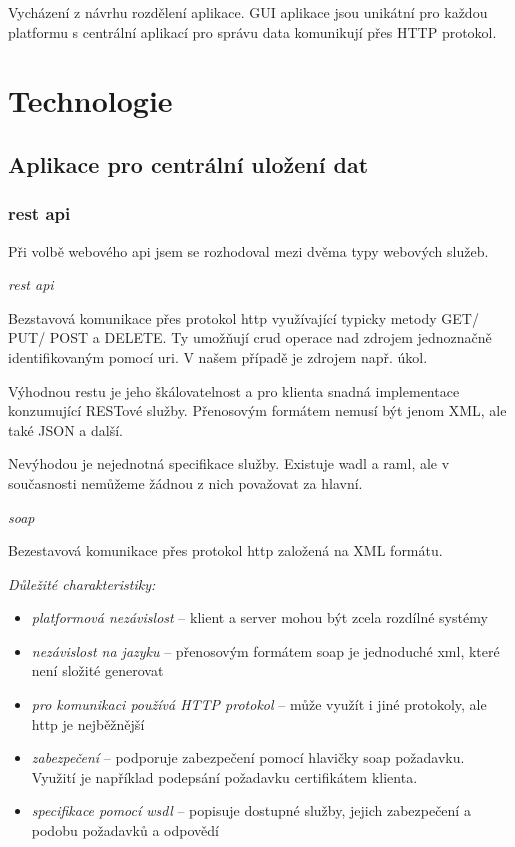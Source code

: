 \documentclass[thesis=B,czech]{FITthesis}[2012/06/26]
\begin{document}
Vycházení z návrhu rozdělení aplikace. GUI aplikace jsou unikátní pro každou platformu s centrální aplikací pro správu data komunikují přes HTTP protokol.

\section{Technologie}

\subsection{Aplikace pro centrální uložení dat}
  
\subsubsection{\acrshort{rest} \acrshort{api}}

Při volbě webového \acrshort{api} jsem se rozhodoval mezi dvěma typy webových služeb.
\newline

\textit{\acrshort{rest} \acrshort{api}}

Bezstavová komunikace přes protokol \acrshort{http} využívající typicky metody GET/ PUT/ POST a  DELETE. Ty umožňují \acrshort{crud} operace nad zdrojem jednoznačně identifikovaným pomocí \acrshort{uri}. V našem případě je zdrojem např. úkol.

Výhodnou \acrshort{rest}u je jeho škálovatelnost a pro klienta snadná implementace konzumující RESTové služby. Přenosovým formátem nemusí být jenom XML, ale také JSON a další. 

Nevýhodou je nejednotná specifikace služby. Existuje \acrshort{wadl} a \acrshort{raml}, ale v současnosti nemůžeme žádnou z nich považovat za hlavní. 

\textit{\acrshort{soap}}

Bezestavová komunikace přes protokol \acrshort{http} založená na XML formátu.

\textit{Důležité charakteristiky:}
\begin{itemize}[nosep]
	\item \textit{platformová nezávislost} -- klient a server mohou být zcela rozdílné systémy
	\item \textit{nezávislost na jazyku} -- přenosovým formátem \acrshort{soap} je jednoduché \acrshort{xml}, které není složité generovat
	\item \textit{pro komunikaci používá HTTP protokol} -- může využít i jiné protokoly, ale \acrshort{http} je nejběžnější
	\item \textit{zabezpečení} -- podporuje zabezpečení pomocí hlavičky soap požadavku. Využití je například podepsání požadavku certifikátem klienta.  
	\item \textit{specifikace pomocí \acrshort{wsdl}} -- popisuje dostupné služby, jejich zabezpečení a podobu požadavků a odpovědí
\end{itemize}
\end{document}
